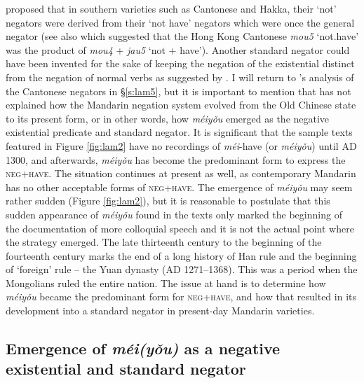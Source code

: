 \documentclass[output=paper]{langscibook}
\begin{document}
\citeauthor{Zhang2002} proposed that in southern varieties such as Cantonese and Hakka, their `not' negators were derived from their `not have' negators which were once the general negator (see also \citealt{Law2014} which suggested that the Hong Kong Cantonese \textit{mou5} `not.have' was the product of \textit{mou4} + \textit{jau5} `not + have'). Another standard negator could have been invented for the sake of keeping the negation of the existential distinct from the negation of normal verbs as suggested by \citet{Veselinova2016}. I will return to \citeauthor{Zhang2002}'s analysis of the Cantonese negators in §\ref{s:lam5}, but it is important to mention that \citeauthor{Zhang2002} has not explained how the Mandarin negation system evolved from the Old Chinese state to its present form, or in other words, how \textit{méiyǒu} emerged as the negative existential predicate and standard negator. It is significant that the sample texts featured in Figure \ref{fig:lam2} have no recordings of \textit{méi}-have (or \textit{méiyǒu}) until AD 1300, and afterwards, \textit{méiyǒu} has become the predominant form to express the \textsc{neg}+\textsc{have}. The situation continues at present as well, as contemporary Mandarin has no other acceptable forms of \textsc{neg}+\textsc{have}. The emergence of \textit{méiyǒu} may seem rather sudden (Figure \ref{fig:lam2}), but it is reasonable to postulate that this sudden appearance of \textit{méiyǒu} found in the texts only marked the beginning of the documentation of more colloquial speech and it is not the actual point where the strategy emerged. The late thirteenth century to the beginning of the fourteenth century marks the end of a long history of Han rule and the beginning of `foreign' rule – the Yuan dynasty (AD 1271–1368). This was a period when the Mongolians ruled the entire nation. The issue at hand is to determine how \textit{méiyǒu} became the predominant form for \textsc{neg}+\textsc{have}, and how that resulted in its development into a standard negator in present-day Mandarin varieties. 



\subsection{Emergence of \textit{méi(yǒu)} as a negative existential and standard negator}\label{s:lam4-2}
\end{document}
